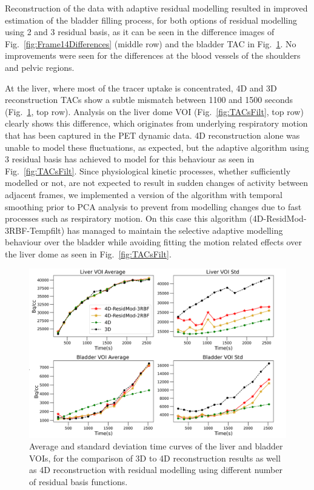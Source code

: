 Reconstruction of the data with adaptive residual modelling resulted in improved estimation of the bladder filling process, for both options of residual modelling using 2 and 3 residual basis, as it can be seen in the difference images of Fig.~\ref{fig:Frame14Differences} (middle row) and the bladder TAC in Fig.~\ref{fig:TACs}. 
No improvements were seen for the differences at the blood vessels of the shoulders and pelvic regions. 

At the liver, where most of the tracer uptake is concentrated, 4D and 3D reconstruction TACs show a subtle mismatch between 1100 and 1500 seconds (Fig.~\ref{fig:TACs}, top row). Analysis on the liver dome VOI (Fig.~\ref{fig:TACsFilt}, top row) clearly shows this difference, which originates from underlying respiratory motion that has been captured in the PET dynamic data. 4D reconstruction alone was unable to model these fluctuations, as expected, but the adaptive algorithm using 3 residual basis has achieved to model for this behaviour as seen in Fig.~\ref{fig:TACsFilt}.
Since physiological kinetic processes, whether sufficiently modelled or not, are not expected to result in sudden changes of activity between adjacent frames, we implemented a version of the algorithm with temporal smoothing prior to PCA analysis to prevent from modelling changes due to fast processes such as respiratory motion. On this case this algorithm (4D-ResidMod-3RBF-Tempfilt) has managed to maintain the selective adaptive modelling behaviour over the bladder while avoiding fitting the motion related effects over the liver dome as seen in Fig.~\ref{fig:TACsFilt}. 

\begin{figure} [!htbp]
\centering
\includegraphics[scale=0.68,angle=0]{3_Results/3_4_Residual/figures/TACs.png}
\caption{Average and standard deviation time curves of the liver and bladder VOIs, for the comparison of 3D to 4D reconstruction results as well as 4D reconstruction with residual modelling using different number of residual basis functions.} 
\label{fig:TACs}
\end{figure}

